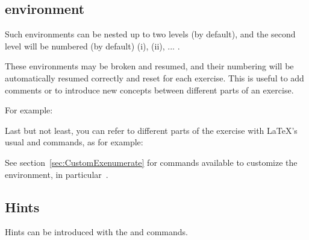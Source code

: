 \documentclass[11pt,a4paper]{article}
\begin{document}
\subsection{ environment}


Such  environments can be nested up to two levels (by default), and
the second level will be numbered (by default) (i), (ii), ... .

These environments may be broken and resumed, and their numbering will be automatically
resumed correctly and reset for each exercise. This is useful to add comments or to
introduce new concepts between different parts of an exercise.

For example:
\begin{pkgverbatim}
%
\end{pkgverbatim}

Last but not least, you can refer to different parts of the exercise with \LaTeX's usual
 and 
commands, as for example:
\begin{pkgverbatim}
%
\end{pkgverbatim}

\begin{pkgtip}
  See section~\ref{sec:CustomExenumerate} for commands available to customize the
   environment, in particular~.
\end{pkgtip}


\subsection{Hints}
\label{sec:Hints}

Hints can be introduced with the  and  commands.


\end{document}
